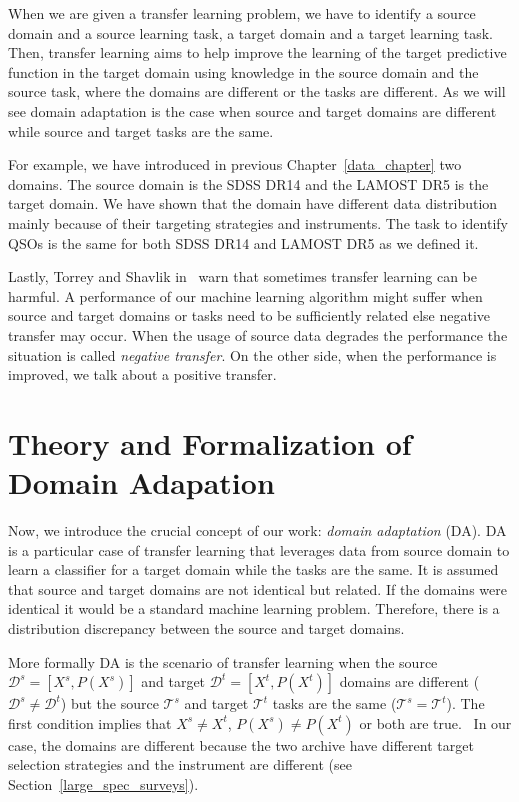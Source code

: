 When we are given a transfer learning problem,
we have to identify a source domain and a source learning task,
a target domain and a target learning task.
Then, transfer learning aims to help improve the learning of the target predictive function in the target domain
using knowledge in the source domain and the source task,
where the domains are different or the tasks are different.
As we will see domain adaptation is the case
when source and target domains are different
while source and target tasks are the same.~\cite{pan2010}

For example, we have introduced in previous Chapter~\ref{data_chapter}
two domains.
The source domain is the SDSS DR14 and the LAMOST DR5 is the target domain.
We have shown that the domain have different data distribution
mainly because of their targeting strategies and instruments.
The task to identify QSOs is the same for both SDSS DR14 and LAMOST DR5
as we defined it.

Lastly, Torrey and Shavlik in~\cite{torrey2010} warn
that sometimes transfer learning can be harmful.
A performance of our machine learning algorithm might suffer
when source and target domains or tasks need to be sufficiently related
else negative transfer may occur.
When the usage of source data degrades the performance
the situation is called \textit{negative transfer}.
On the other side, when the performance is improved,
we talk about a positive transfer.

\section{Theory and Formalization of Domain Adapation}

Now, we introduce the crucial concept of our work: \textit{domain adaptation} (DA).
DA is a particular case of transfer learning
that leverages data from source domain to learn a classifier for a target domain while the tasks are the same.
It is assumed that source and target domains are not identical but related.
If the domains were identical it would be a standard machine learning problem.
Therefore, there is a distribution discrepancy between the source and target domains.~\cite{csurka2017}

More formally DA is the scenario of transfer learning
when the source \(\mathcal{D}^s = [X^s, P(X^s)]\)
and target \(\mathcal{D}^t = [X^t, P(X^t)]\) domains
are different (\(\mathcal{D}^s \ne \mathcal{D}^t\))
but the source \(\mathcal{T}^s\) and target \(\mathcal{T}^t\)
tasks are the same (\(\mathcal{T}^s = \mathcal{T}^t\)).
The first condition implies
that \(X^s \ne X^t\), \(P(X^s) \ne P(X^t)\) or both are true.~\cite{pan2010}
In our case, the domains are different
because the two archive have different target selection strategies
and the instrument are different (see Section~\ref{large_spec_surveys}).


